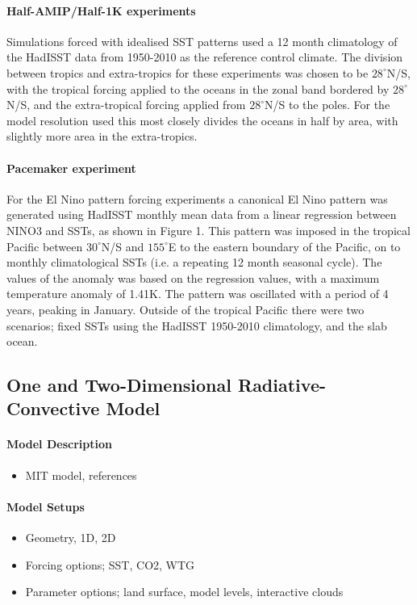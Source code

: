 \paragraph{Half-AMIP/Half-1K experiments}
Simulations forced with idealised SST patterns used a 12 month climatology of 
the HadISST data from 1950-2010 as the reference control climate. The division 
between tropics and extra-tropics for these experiments was chosen to be 
$28^{\circ}$N/S, with the tropical forcing applied to the oceans in the zonal 
band bordered by $28^{\circ}$N/S, and the extra-tropical forcing applied from 
$28^{\circ}$N/S to the poles. For the model resolution used this most closely 
divides the oceans in half by area, with slightly more area in the 
extra-tropics.

\paragraph{Pacemaker experiment}
For the El Nino pattern forcing experiments a canonical El Nino pattern was 
generated using HadISST monthly mean data from a linear regression between NINO3 
and SSTs, as shown in Figure 1. This pattern was imposed in the tropical Pacific 
between $30^{\circ}$N/S and $155^{\circ}$E to the eastern boundary of the 
Pacific, on to monthly climatological SSTs (i.e. a repeating 12 month seasonal 
cycle).  The values of the anomaly was based on the regression values, with a 
maximum temperature anomaly of 1.41K.  The pattern was oscillated with a period 
of 4 years, peaking in January.  Outside of the tropical Pacific there were two 
scenarios; fixed SSTs using the HadISST 1950-2010 climatology, and the slab 
ocean. 



\subsection{One and Two-Dimensional Radiative-Convective Model}

\paragraph{Model Description}
\begin{itemize}
	\item MIT model, references
\end{itemize}

\paragraph{Model Setups}
\begin{itemize}
	\item Geometry, 1D, 2D
	\item Forcing options; SST, CO2, WTG
	\item Parameter options; land surface, model levels, interactive clouds
\end{itemize}

